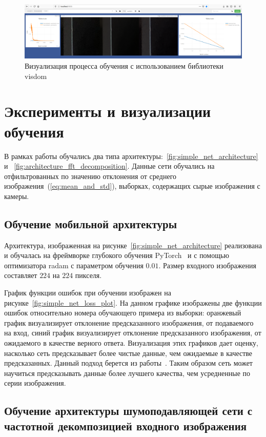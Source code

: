 \documentclass[14pt]{mmcs_article}
\begin{document}
\begin{figure}[H]
	\centering
	\includegraphics[width=\textwidth]{img/visdom_example}
	\caption{Визуализация процесса обучения с использованием библиотеки visdom}
	\label{fig:visdom_example}
\end{figure}

\section{Эксперименты и визуализации обучения}

В рамках работы обучались два типа архитектуры:~\ref{fig:simple_net_architecture} и ~\ref{fig:architecture_fft_decomposition}. Данные сети обучались на отфильтрованных по значению отклонения от среднего изображения~(\ref{eq:mean_and_std}), выборках, содержащих сырые изображения с камеры.

\subsection{Обучение мобильной архитектуры}
Архитектура, изображенная на рисунке~\ref{fig:simple_net_architecture} реализована и обучалась на фреймворке глубокого обучения PyTorch~\autocite{PyTorchCite} и с помощью оптимизатора radam с параметром обучения $0.01$. Размер входного изображения составляет $224$ на $224$ пикселя.

График функции ошибок при обучении изображен на рисунке~\ref{fig:simple_net_loss_plot}. На данном графике изображены две функции ошибок относительно номера обучающего примера из выборки: оранжевый график визуализирует отклонение предсказанного изображения, от подаваемого на вход, синий график визуализирует отклонение предсказанного изображения, от ожидаемого в качестве верного ответа. Визуализация этих графиков дает оценку, насколько сеть предсказывает более чистые данные, чем ожидаемые в качестве предсказанных. Данный подход берется из работы~\autocite{Noise2NoisePaper}. Таким образом сеть может научиться предсказывать данные более лучшего качества, чем усредненные по серии изображения.

\subsection{Обучение  архитектуры шумоподавляющей сети с частотной декомпозицией входного изображения}
\end{document}

